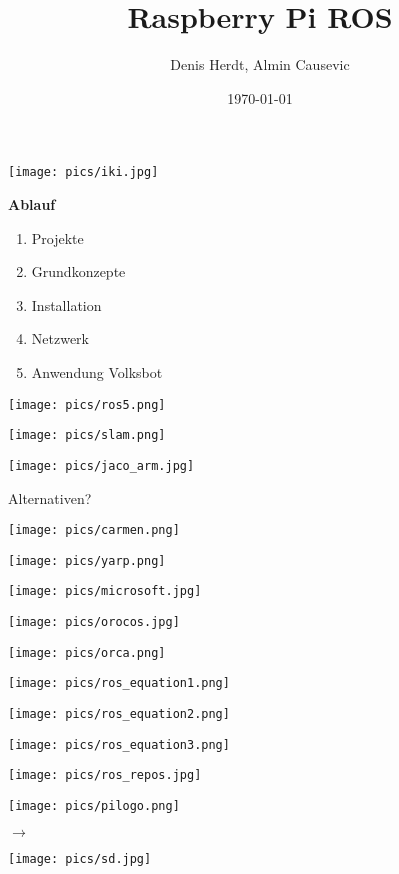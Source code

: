 \documentclass{beamer}
\title[Raspberry Pi ROS]{Raspberry Pi ROS}
\author{Denis Herdt, Almin Causevic}
\institute[I_HS Wgt-Rav]{Angewandte Informatik HS Weingarten-Ravensburg}
\date{\today}
\begin{document}
\frame{\titlepage}

\begin{frame}
\centerline{\texttt{[image: pics/iki.jpg]}}
\end{frame}

\begin{frame}
{\bf Ablauf}
\begin{enumerate}
\item Projekte
\item Grundkonzepte
\item Installation
\item Netzwerk
\item Anwendung Volksbot
\end{enumerate}
\end{frame}

\begin{frame}
\centerline{\texttt{[image: pics/ros5.png]}}
\end{frame}

\begin{frame}
\centerline{\texttt{[image: pics/slam.png]}}
\end{frame}

\begin{frame}
\centerline{\texttt{[image: pics/jaco\_arm.jpg]}}
\end{frame}

\begin{frame}
Alternativen? \\
\parbox{5cm}{\texttt{[image: pics/carmen.png]}}
\parbox{5cm}{\texttt{[image: pics/yarp.png]}}
\parbox{5cm}{\texttt{[image: pics/microsoft.jpg]}}
\hspace{5cm}
\parbox{5cm}{\texttt{[image: pics/orocos.jpg]}}
\parbox{5cm}{\texttt{[image: pics/orca.png]}}
\end{frame}

\begin{frame}
\centerline{\texttt{[image: pics/ros\_equation1.png]}}
\centerline{\texttt{[image: pics/ros\_equation2.png]}}
\centerline{\texttt{[image: pics/ros\_equation3.png]}}
\end{frame}

\begin{frame}
\centerline{\texttt{[image: pics/ros\_repos.jpg]}}
\end{frame}


\begin{frame}
\parbox{5cm}{\texttt{[image: pics/pilogo.png]}}
$\rightarrow$
\parbox{5cm}{\texttt{[image: pics/sd.jpg]}}
\end{frame}
\end{document}
